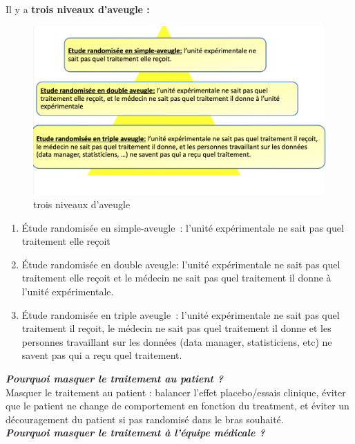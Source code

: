 Il y a \textbf{trois niveaux d'aveugle : }
\begin{figure}[H]
    \centering
    \includegraphics[scale = 0.3]{images/3_blind_levels.png}
    \caption{trois niveaux d'aveugle}
    \label{fig:my_label}
\end{figure}
\begin{enumerate}
    \item  Étude randomisée en simple-aveugle : l’unité expérimentale ne sait pas quel traitement elle reçoit
    \item  Étude randomisée en double aveugle: l’unité expérimentale ne sait pas quel traitement elle reçoit et le médecin ne sait pas quel traitement il donne à l’unité expérimentale.
    \item Étude randomisée en triple aveugle : l’unité expérimentale ne sait pas quel traitement il reçoit, le médecin ne sait pas quel traitement il donne et les personnes travaillant sur les données (data manager, statisticiens, etc) ne savent pas qui a reçu quel traitement.
    
\end{enumerate}
\vspace{0.15cm}



\textbf{\textit{Pourquoi masquer le traitement au patient ?}}\\

Masquer le traitement au patient : balancer l’effet placebo/essais clinique, éviter que le patient ne change de comportement en fonction du treatment, et éviter un découragement du patient si pas randomisé dans le bras souhaité.\\


\textbf{\textit{Pourquoi masquer le traitement à l’équipe médicale ?}}\\


